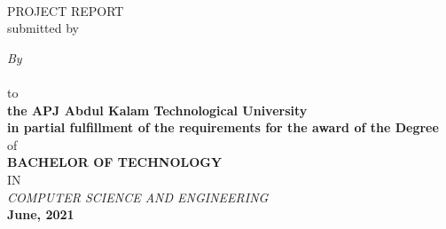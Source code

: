\begin{titlepage}
\begin{center}
{\Large\sf \textbf{\textcolor[rgb]{0,0,0}{\projectName}}}\\[5ex]
\vspace{0.3 cm}
PROJECT REPORT\\
submitted by

{\small \textcolor[rgb]{0,0,0}{\emph{By}} \\[1ex]

{\sf \sf {\textcolor[rgb]{0,0,0}{
			\firstAuthor (\firstAuthorRegNo) \\ 
			\secondAuthor (\secondAuthorRegNo) \\
			\thirdAuthor (\thirdAuthorRegNo) \\
			\fourthAuthor (\fourthAuthorRegNo)}}} \\%
		  
\vspace{0.5 cm}
to
\\
\vspace{0.5 cm}
\textbf{the APJ Abdul Kalam Technological University \\
	in partial fulfillment of the requirements for the award of the Degree }\\
\vspace{0.8 cm}
of
\\
 

\textbf{BACHELOR OF TECHNOLOGY}}
\\
IN 
\\
\textit{COMPUTER SCIENCE AND ENGINEERING}
\\
    \textbf{ June, 2021}
\vspace{0.2 cm} \\[2ex]


\end{center}
\end{titlepage}
